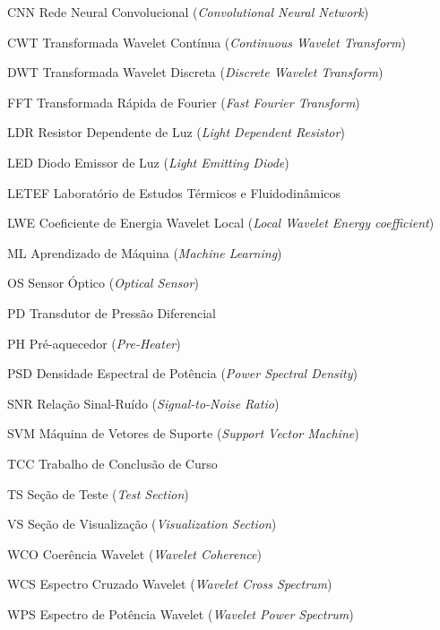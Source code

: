\begin{siglas}
  \item[CNN] Rede Neural Convolucional (\textit{Convolutional Neural Network})
  \item[CWT] Transformada Wavelet Contínua (\textit{Continuous Wavelet Transform})
  \item[DWT] Transformada Wavelet Discreta (\textit{Discrete Wavelet Transform})
  \item[FFT] Transformada Rápida de Fourier (\textit{Fast Fourier Transform})
  \item[LDR] Resistor Dependente de Luz (\textit{Light Dependent Resistor})
  \item[LED] Diodo Emissor de Luz (\textit{Light Emitting Diode})
  \item[LETEF] Laboratório de Estudos Térmicos e Fluidodinâmicos
  \item[LWE] Coeficiente de Energia Wavelet Local (\textit{Local Wavelet Energy coefficient})
  \item[ML] Aprendizado de Máquina (\textit{Machine Learning})
  \item[OS] Sensor Óptico (\textit{Optical Sensor})
  \item[PD] Transdutor de Pressão Diferencial
  \item[PH] Pré-aquecedor (\textit{Pre-Heater})
  \item[PSD] Densidade Espectral de Potência (\textit{Power Spectral Density})
  \item[SNR] Relação Sinal-Ruído (\textit{Signal-to-Noise Ratio})
  \item[SVM] Máquina de Vetores de Suporte (\textit{Support Vector Machine})
  \item[TCC] Trabalho de Conclusão de Curso
  \item[TS] Seção de Teste (\textit{Test Section})
  \item[VS] Seção de Visualização (\textit{Visualization Section})
  \item[WCO] Coerência Wavelet (\textit{Wavelet Coherence})
  \item[WCS] Espectro Cruzado Wavelet (\textit{Wavelet Cross Spectrum})
  \item[WPS] Espectro de Potência Wavelet (\textit{Wavelet Power Spectrum})
\end{siglas}

